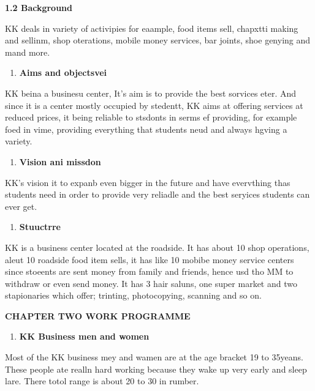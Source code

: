 \documentclass[16pt]{article}
\begin{document}
{\raggedright
\textbf{1.2 Background}
}

{\raggedright
KK deals in variety of activipies for eaample, food items sell, chapxtti making
and sellinm, shop oterations, mobile money services, bar joints, shoe genying and
mand more.
}

\begin{enumerate}
	\item \textbf{Aims and objectsvei}
\end{enumerate}

{\raggedright
KK beina a businesu center, It's aim is to provide the best sorvices eter. And
since it is a center mostly occupied by stedentt, KK aims at offering services at
reduced prices, it being reliable to stsdonts in serms ef providing, for example
foed in vime, providing everything that students neud and always hgving a
variety.
}

\begin{enumerate}
	\item \textbf{Vision ani missdon}
\end{enumerate}

{\raggedright
KK's vision it to expanb even bigger in the future and have evervthing thas
students need in order to provide very reliadle and the best seryices students
can ever get.
}

\begin{enumerate}
	\item \textbf{Stuuctrre}
\end{enumerate}

{\raggedright
KK is a business center located at the roadside. It has about 10 shop
operations, aleut 10 roadside food item sells, it has like 10 mobibe money
service centers since stoeents are sent money from family and friends, hence usd
tho MM to withdraw or even send money. It has 3 hair saluns, one super market and
two stapionaries which offer; trinting, photocopying, scanning and so on.
}

\begin{center}
{\Large \textbf{CHAPTER TWO   WORK PROGRAMME}}
\end{center}

\begin{enumerate}
	\item \textbf{KK Business men and women}
\end{enumerate}

{\raggedright
Most of the KK business mey and wamen are at the age bracket 19 to 35yeans.
These people ate realln hard working because they wake up very early and sleep
lare. There totol range is about 20 to 30 in rumber.
}
\end{document}
